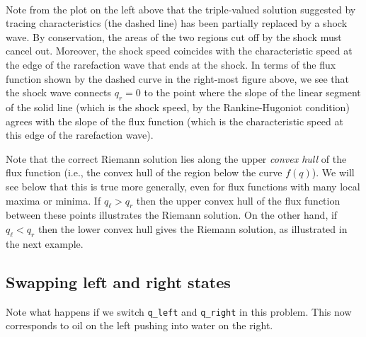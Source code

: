\documentclass{SIAMbook2016}
\begin{document}
    \begin{center}
    \end{center}
    { \hspace*{\fill} \\}
    
Note from the plot on the left above that the triple-valued solution
suggested by tracing characteristics (the dashed line) has been
partially replaced by a shock wave. By conservation, the areas of the
two regions cut off by the shock must cancel out. Moreover, the shock
speed coincides with the characteristic speed at the edge of the
rarefaction wave that ends at the shock. In terms of the flux function
shown by the dashed curve in the right-most figure above, we see that
the shock wave connects \(q_r=0\) to the point where the slope of the
linear segment of the solid line (which is the shock speed, by the
Rankine-Hugoniot condition) agrees with the slope of the flux function
(which is the characteristic speed at this edge of the rarefaction
wave).

Note that the correct Riemann solution lies along the upper \emph{convex
hull} of the flux function (i.e., the convex hull of the region below
the curve \(f(q)\)). We will see below that this is true more generally,
even for flux functions with many local maxima or minima. If
\(q_\ell > q_r\) then the upper convex hull of the flux function between
these points illustrates the Riemann solution. On the other hand, if
\(q_\ell < q_r\) then the lower convex hull gives the Riemann solution,
as illustrated in the next example.

\hypertarget{swapping-left-and-right-states}{%
\subsection{Swapping left and right
states}\label{swapping-left-and-right-states}}

Note what happens if we switch \texttt{q\_left} and \texttt{q\_right} in
this problem. This now corresponds to oil on the left pushing into water
on the right.
\end{document}
